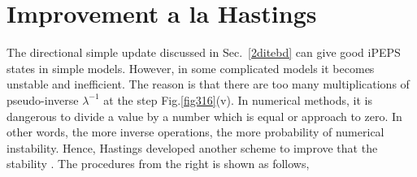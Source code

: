 \section{Improvement a la Hastings}
\label{2dhastin}

The directional simple update discussed in Sec.~\ref{2ditebd} can give good iPEPS states in simple models. However, in some complicated models it becomes unstable and inefficient. The reason is that there are too many multiplications of pseudo-inverse $\lambda^{-1}$ at the step Fig.\ref{fig316}(v). In numerical methods, it is dangerous to divide a value by a number which is equal or approach to zero. In other words, the more inverse operations, the more probability of numerical instability. Hence, Hastings developed another scheme to improve that the stability \cite{light_hastings}. The procedures from the right is shown as follows,

